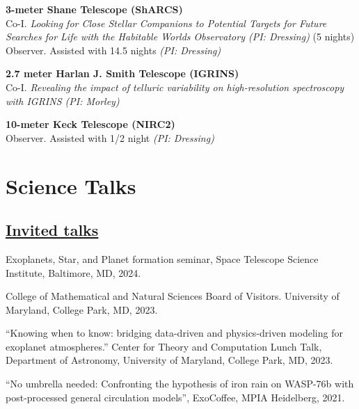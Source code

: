 \documentclass[letterpaper,12pt]{article}
\newcommand{\shorterSection}[1]{\section{#1}}
\newcommand{\shortershorterSection}[1]{\subsection{#1}}
\renewcommand{\small}{\normalsize}
\renewcommand{\scriptsize}{\normalsize}
\begin{document}
\begin{list}{}{\cvlist}
     \item[{\color{numcolor}}]\textbf{3-meter Shane Telescope (ShARCS)} \\
     Co-I.  \textit{Looking for Close Stellar Companions to Potential Targets for Future Searches for Life with the Habitable Worlds Observatory (PI: Dressing)} (5 nights)\\
     Observer. Assisted with 14.5 nights \textit{(PI: Dressing)}


     \item[{\color{numcolor}}]\textbf{2.7 meter Harlan J. Smith Telescope (IGRINS)} \\
     Co-I. \textit{Revealing the impact of telluric variability on high-resolution spectroscopy with IGRINS (PI: Morley)}

     
     \item[{\color{numcolor}}]\textbf{10-meter Keck Telescope (NIRC2)} \\
     Observer. Assisted with 1/2 night \textit{(PI: Dressing)}
  
  \end{list}


\shorterSection{Science Talks}
\vspace{12pt}
\shortershorterSection{\underline{Invited talks}}
\small
  \begin{list}{}{\cvlist}

  \item[{\color{numcolor}\scriptsize4}] Exoplanets, Star, and Planet formation seminar, Space Telescope Science Institute, Baltimore, MD, 2024.

  \item[{\color{numcolor}\scriptsize3}]  College of Mathematical and Natural Sciences Board of Visitors. University of Maryland, College Park, MD, 2023.

  

  \item[{\color{numcolor}\scriptsize2}] ``Knowing when to know: bridging data-driven and physics-driven modeling for exoplanet atmospheres.'' Center for Theory and Computation Lunch Talk, Department of Astronomy, University of Maryland, College Park, MD, 2023.

   \item[{\color{numcolor}\scriptsize1}] ``No umbrella needed: Confronting the hypothesis of iron rain on WASP-76b with post-processed general circulation models'', ExoCoffee, MPIA Heidelberg, 2021.


  \end{list}
\end{document}
